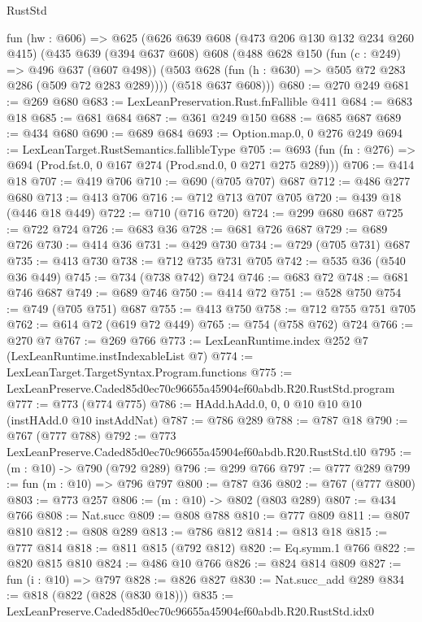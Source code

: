 \begin{lexlean}{RustStd}
\begin{coremodule}
  fun (hw : @606) =>
  @625
    (@626
      @639
      @608
      (@473 @206 @130 @132 @234 @260 @415)
      (@435
        @639
        (@394 @637 @608)
        @608
        (@488
          @628
          @150
          (fun (c : @249) => @496 @637 (@607 @498))
          (@503 @628 (fun (h : @630) => @505 @72 @283 @286 (@509 @72 @283 @289))))
        (@518 @637 @608)))
@680 := @270 @249
@681 := @269 @680
@683 := LexLeanPreservation.Rust.fnFallible @411
@684 := @683 @18
@685 := @681 @684
@687 := @361 @249 @150
@688 := @685 @687
@689 := @434 @680
@690 := @689 @684
@693 := Option.map.{0, 0} @276 @249
@694 := LexLeanTarget.RustSemantics.fallibleType
@705 := @693 (fun (fn : @276) => @694 (Prod.fst.{0, 0} @167 @274 (Prod.snd.{0, 0} @271 @275 @289)))
@706 := @414 @18
@707 := @419 @706
@710 := @690 (@705 @707) @687
@712 := @486 @277 @680
@713 := @413 @706
@716 := @712 @713 @707 @705
@720 := @439 @18 (@446 @18 @449)
@722 := @710 (@716 @720)
@724 := @299 @680 @687
@725 := @722 @724
@726 := @683 @36
@728 := @681 @726 @687
@729 := @689 @726
@730 := @414 @36
@731 := @429 @730
@734 := @729 (@705 @731) @687
@735 := @413 @730
@738 := @712 @735 @731 @705
@742 := @535 @36 (@540 @36 @449)
@745 := @734 (@738 @742) @724
@746 := @683 @72
@748 := @681 @746 @687
@749 := @689 @746
@750 := @414 @72
@751 := @528 @750
@754 := @749 (@705 @751) @687
@755 := @413 @750
@758 := @712 @755 @751 @705
@762 := @614 @72 (@619 @72 @449)
@765 := @754 (@758 @762) @724
@766 := @270 @7
@767 := @269 @766
@773 := LexLeanRuntime.index @252 @7 (LexLeanRuntime.instIndexableList @7)
@774 := LexLeanTarget.TargetSyntax.Program.functions
@775 := LexLeanPreserve.Caded85d0ec70c96655a45904ef60abdb.R20.RustStd.program
@777 := @773 (@774 @775)
@786 := HAdd.hAdd.{0, 0, 0} @10 @10 @10 (instHAdd.{0} @10 instAddNat)
@787 := @786 @289
@788 := @787 @18
@790 := @767 (@777 @788)
@792 := @773 LexLeanPreserve.Caded85d0ec70c96655a45904ef60abdb.R20.RustStd.tl0
@795 := (m : @10) -> @790 (@792 @289)
@796 := @299 @766
@797 := @777 @289
@799 := fun (m : @10) => @796 @797
@800 := @787 @36
@802 := @767 (@777 @800)
@803 := @773 @257
@806 := (m : @10) -> @802 (@803 @289)
@807 := @434 @766
@808 := Nat.succ
@809 := @808 @788
@810 := @777 @809
@811 := @807 @810
@812 := @808 @289
@813 := @786 @812
@814 := @813 @18
@815 := @777 @814
@818 := @811 @815 (@792 @812)
@820 := Eq.symm.{1} @766
@822 := @820 @815 @810
@824 := @486 @10 @766
@826 := @824 @814 @809
@827 := fun (i : @10) => @797
@828 := @826 @827
@830 := Nat.succ_add @289
@834 := @818 (@822 (@828 (@830 @18)))
@835 := LexLeanPreserve.Caded85d0ec70c96655a45904ef60abdb.R20.RustStd.idx0

\end{coremodule}
\end{lexlean}
